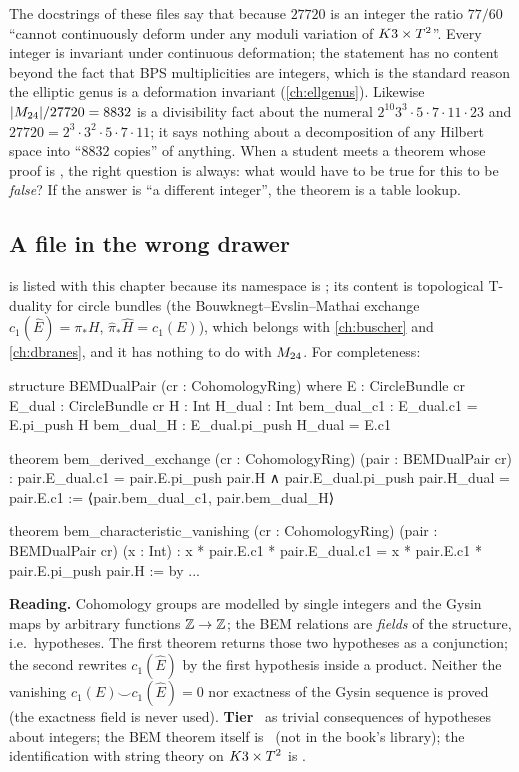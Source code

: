 \begin{pitfallbox}
The docstrings of these files say that because $27720$ is an integer the ratio $77/60$
``cannot continuously deform under any moduli variation of $K3\times T^2$''. Every integer is
invariant under continuous deformation; the statement has no content beyond the fact that
BPS multiplicities are integers, which is the standard reason the elliptic genus is a
deformation invariant (\cref{ch:ellgenus}). Likewise $|M_{24}|/27720=8832$ is a divisibility
fact about the numeral $2^{10}3^3\cdot5\cdot7\cdot11\cdot23$ and $27720=2^3\cdot3^2\cdot5\cdot7\cdot11$;
it says nothing about a decomposition of any Hilbert space into ``$8832$ copies'' of
anything. When a student meets a theorem whose proof is , the right question is
always: what would have to be true for this to be \emph{false}? If the answer is ``a
different integer'', the theorem is a table lookup.
\end{pitfallbox}

\subsection{A file in the wrong drawer}

 is listed with this chapter
because its namespace is ; its content is
topological T-duality for circle bundles (the Bouwknegt--Evslin--Mathai exchange
$c_1(\hat E)=\pi_*H$, $\hat\pi_*\hat H=c_1(E)$), which belongs with \cref{ch:buscher} and
\cref{ch:dbranes}, and it has nothing to do with $M_{24}$. For completeness:
\begin{leancode}
structure BEMDualPair (cr : CohomologyRing) where
  E : CircleBundle cr
  E_dual : CircleBundle cr
  H : Int
  H_dual : Int
  bem_dual_c1 : E_dual.c1 = E.pi_push H
  bem_dual_H  : E_dual.pi_push H_dual = E.c1

theorem bem_derived_exchange (cr : CohomologyRing) (pair : BEMDualPair cr) :
    pair.E_dual.c1 = pair.E.pi_push pair.H ∧
    pair.E_dual.pi_push pair.H_dual = pair.E.c1 := ⟨pair.bem_dual_c1, pair.bem_dual_H⟩

theorem bem_characteristic_vanishing (cr : CohomologyRing) (pair : BEMDualPair cr)
    (x : Int) :
    x * pair.E.c1 * pair.E_dual.c1 = x * pair.E.c1 * pair.E.pi_push pair.H := by ...
\end{leancode}
\textbf{Reading.} Cohomology groups are modelled by single integers and the Gysin maps by
arbitrary functions $\mathbb{Z}\to\mathbb{Z}$; the BEM relations are \emph{fields} of the structure, i.e.\
hypotheses. The first theorem returns those two hypotheses as a conjunction; the second
rewrites $c_1(\hat E)$ by the first hypothesis inside a product. Neither the vanishing
$c_1(E)\smile c_1(\hat E)=0$ nor exactness of the Gysin sequence is proved (the exactness
field \lean{h\_exact\_push\_pull} is never used). \textbf{Tier} \TA\ as trivial
consequences of hypotheses about integers; the BEM theorem itself is \TL\ (not in the book's
library); the identification with string theory on $K3\times T^2$ is \TC.

